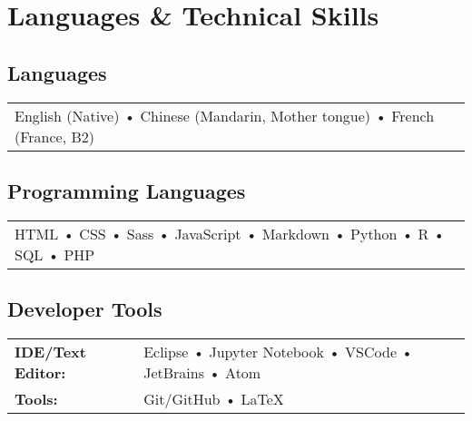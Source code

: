\documentclass[10pt,a4paper]{cv-nl}
\begin{document}
\section{Languages \& Technical Skills}
\vspace{5pt}

\subsection{Languages}
\vspace{2.5pt}
\begingroup
\renewcommand{\arraystretch}{1.5} 
\centering
\begin{tabular}{P{6in}}
English (Native) • Chinese (Mandarin, Mother tongue) • French (France, B2) \\ 
\end{tabular}
\endgroup
\vspace{10pt}

\subsection{Programming Languages}
\vspace{2.5pt}
\begingroup
\renewcommand{\arraystretch}{1.5} 
\centering
\begin{tabular}{P{6in}}
HTML • CSS • Sass • JavaScript • Markdown • Python • R • SQL • PHP 
\end{tabular}
\endgroup
\vspace{10pt}

\subsection{Developer Tools}
\vspace{2.5pt}
\begingroup
\renewcommand{\arraystretch}{1.5} 
\begin{tabular}{p{1.5in}<{\raggedleft\arraybackslash}p{4.435in}}
{\bf IDE/Text Editor:} & Eclipse • Jupyter Notebook • VSCode • JetBrains • Atom \\
{\bf Tools:} & Git/GitHub • \LaTeX \\
\end{tabular}
\endgroup
\vspace{10pt}
\end{document}
